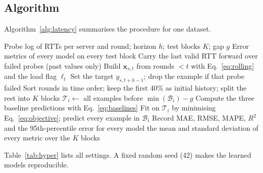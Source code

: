 \documentclass[pdflatex,sn-mathphys-num]{sn-jnl}
\begin{document}
\subsection{Algorithm}\label{sec:algorithm}

Algorithm~\ref{alg:latency} summarises the procedure for one dataset.

\begin{algorithm}[t]
\caption{Leak-free short-term RTT prediction with forward-chaining evaluation}\label{alg:latency}
\begin{algorithmic}[1]
\Require Probe log of RTTs per server and round; horizon $h$; test blocks $K$; gap $g$
\Ensure Error metrics of every model on every test block
  \State Carry the last valid RTT forward over failed probes (past values only)
    \State Build $\mathbf{x}_{s,t}$ from rounds $< t$ with Eq.~\ref{eq:rolling} and the load flag $\ell_t$
    \State Set the target $y_{s,t+h-1}$; drop the example if that probe failed
  \EndFor
\EndFor
\State Sort rounds in time order; keep the first 40\% as initial history; split the rest into $K$ blocks
  \State $\mathcal{T}_i \gets$ all examples before $\min(\mathcal{B}_i) - g$ 
  \State Compute the three baseline predictions with Eq.~\ref{eq:baselines}
    \State Fit on $\mathcal{T}_i$ by minimising Eq.~\ref{eq:objective}; predict every example in $\mathcal{B}_i$
  \EndFor
  \State Record MAE, RMSE, MAPE, $R^2$ and the 95th-percentile error for every model
\EndFor
\State \Return the mean and standard deviation of every metric over the $K$ blocks
\end{algorithmic}
\end{algorithm}

Table~\ref{tab:hyper} lists all settings. A fixed random seed (42) makes the learned models reproducible.
\end{document}

